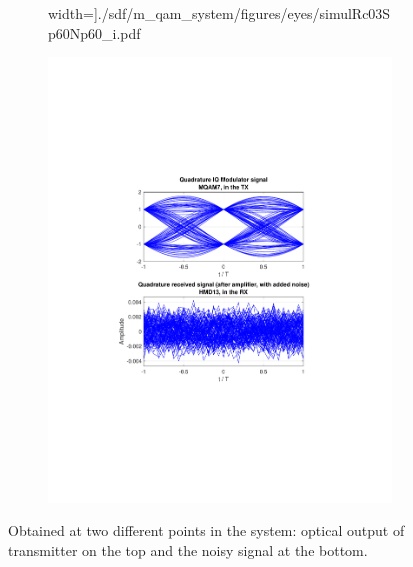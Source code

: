 \begin{refsection}
\begin{figure}[H]
\begin{minipage}{\linewidth}
\begin{subfigure}{.45\textwidth}
		width=\textwidth]{./sdf/m_qam_system/figures/eyes/simulRc03Sp60Np60_i.pdf}
	\end{subfigure}
	\begin{subfigure}{.45\textwidth}
		\centering
		\includegraphics[clip, trim=4cm 7cm 4cm 7cm, 
		width=\textwidth]{./sdf/m_qam_system/figures/eyes/simulRc03Sp60Np60_q.pdf}
	\end{subfigure}
	
	\caption{
		Obtained
		at two different points in the system: optical output of transmitter on the top and
		the noisy signal at the bottom.
		\label{fig:eyes_n_rrc_60_03}}
	\end{minipage}
\end{figure}
\begin{table}[H]
	\centering
	

\end{table}
\end{refsection}
